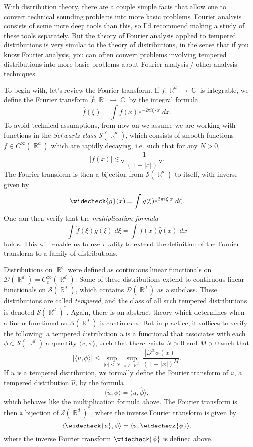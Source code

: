 \documentclass[answers]{exam}
\DeclareMathOperator{\CC}{\mathbb{C}}
\DeclareMathOperator{\RR}{\mathbb{R}}
\theoremstyle{problemstyle}
\newcommand{\1}[1]{\textbf{1}_{\left[#1\right]}} %
\begin{document}
\begin{questions}
With distribution theory, there are a couple simple facts that allow one to convert technical sounding problems into more basic problems. Fourier analysis consists of some more deep tools than this, so I'd recommend making a study of these tools separately. But the theory of Fourier analysis applied to tempered distributions is very similar to the theory of distributions, in the sense that if you know Fourier analysis, you can often convert problems involving tempered distributions into more basic problems about Fourier analysis / other analysis techniques.

To begin with, let's review the Fourier transform. If $f: \RR^d \to \CC$ is integrable, we define the Fourier transform $\widehat{f}: \RR^d \to \CC$ by the integral formula
%
\[ \widehat{f}(\xi) = \int f(x) e^{-2 \pi i \xi \cdot x}\; dx. \]
%
To avoid technical assumptions, from now on we assume we are working with functions in the \emph{Schwartz class} $\mathcal{S}(\RR^d)$, which consists of smooth functions $f \in C^\infty(\RR^d)$ which are rapidly decaying, i.e. such that for any $N > 0$,
%
\[ |f(x)| \lesssim_N \frac{1}{(1 + |x|)^N}. \]
%
The Fourier transform is then a bijection from $\mathcal{S}(\RR^d)$ to itself, with inverse given by
%
\[ \widecheck{g}(x) = \int g(\xi) e^{2 \pi i \xi \cdot x}\; d \xi. \]
%
One can then verify that the \emph{multiplication formula}
%
\[ \int \widehat{f}(\xi) g(\xi)\; d\xi = \int f(x) \widehat{g}(x)\; dx \]
%
holds. This will enable us to use duality to extend the definition of the Fourier transform to a family of distributions.

Distributions on $\RR^d$ were defined as continuous linear functionals on $\mathcal{D}(\RR^d) = C_c^\infty(\RR^d)$. Some of these distributions extend to continuous linear functionals on $\mathcal{S}(\RR^d)$, which contains $\mathcal{D}(\RR^d)$ as a subclass. These distributions are called \emph{tempered}, and the class of all such tempered distributions is denoted $\mathcal{S}(\RR^d)^*$. Again, there is an abstract theory which determines when a linear functional on $\mathcal{S}(\RR^d)$ is continuous. But in practice, it suffices to verify the following: a tempered distribution $u$ is a functional that associates with each $\phi \in \mathcal{S}(\RR^d)$ a quantity $\langle u, \phi \rangle$, such that there exists $N > 0$ and $M > 0$ such that
%
\[ |\langle u, \phi \rangle| \leq \sup_{|\alpha| \leq N} \sup_{x \in \RR^d} \frac{|D^\alpha \phi(x)|}{(1 + |x|)^M}. \]
%
If $u$ is a tempered distribution, we formally define the Fourier transform of $u$, a tempered distribution $\widehat{u}$, by the formula
%
\[ \langle \widehat{u}, \phi \rangle = \langle u, \widehat{\phi} \rangle, \]
%
which behaves like the multiplication formula above. The Fourier transform is then a bijection of $\mathcal{S}(\RR^d)^*$, where the inverse Fourier transform is given by
%
\[ \langle \widecheck{u}, \phi \rangle = \langle u, \widecheck{\phi} \rangle, \]
%
where the inverse Fourier transform $\widecheck{\phi}$ is defined above.


\end{questions}
\end{document}
